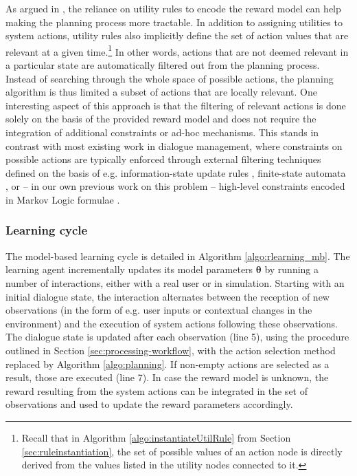 As argued in \cite{onlineplanning-iwsds2012}, the reliance on utility rules to encode the reward model can help making the planning process more tractable.  In addition to assigning utilities to system actions, utility rules also implicitly define the set of action values that are relevant at a given time.\footnote{Recall that in Algorithm \ref{algo:instantiateUtilRule} from Section \ref{sec:ruleinstantiation}, the set of possible values of an action node is directly derived from the values listed in the utility nodes connected to it.} In other words, actions that are not deemed relevant in a particular state are automatically filtered out from the planning process.  Instead of searching through the whole space of possible actions, the planning algorithm is thus limited a subset of actions that are locally relevant.  One interesting aspect of this approach is that the filtering of relevant actions is done solely on the basis of the provided reward model and does not require the integration of additional constraints or ad-hoc mechanisms. This stands in contrast with most existing work in dialogue management, where constraints on possible actions are typically enforced through external filtering techniques defined on the basis of e.g. information-state update rules \citep{heeman2007}, finite-state automata \citep{williams2008}, or -- in our own previous work on this problem -- high-level constraints encoded in Markov Logic formulae \citep{srw-acl2010}. 

 
\subsubsection*{Learning cycle}

The model-based learning cycle is detailed in Algorithm \ref{algo:rlearning_mb}. The learning agent incrementally updates its model parameters $\boldsymbol\theta$  by running a number of interactions, either with a real user or in simulation. Starting with an initial dialogue state, the interaction alternates between the reception of new observations (in the form of e.g. user inputs or contextual changes in the environment) and the execution of system actions following these observations.  The dialogue state is updated after each observation (line 5), using the procedure outlined in Section \ref{sec:processing-workflow}, with the action selection method replaced by Algorithm \ref{algo:planning}. If non-empty actions are selected as a result, those are executed (line 7).   In case the reward model is unknown, the reward resulting from the system actions can be integrated in the set of observations and used to update the reward parameters accordingly. 

